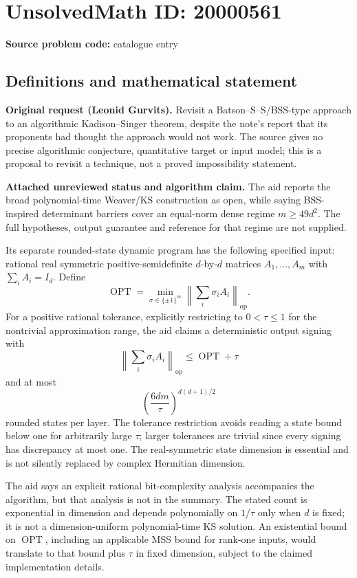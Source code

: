 \documentclass[11pt]{article}
\begin{document}
\section*{UnsolvedMath ID: 20000561}
\textbf{Source problem code:} catalogue entry
\subsection{Definitions and mathematical statement}
\textbf{Original request (Leonid Gurvits).} Revisit a Batson--S--S/BSS-type approach to an algorithmic Kadison--Singer theorem, despite the note's report that its proponents had thought the approach would not work. The source gives no precise algorithmic conjecture, quantitative target or input model; this is a proposal to revisit a technique, not a proved impossibility statement.

\textbf{Attached unreviewed status and algorithm claim.} The aid reports the broad polynomial-time Weaver/KS construction as open, while saying BSS-inspired determinant barriers cover an equal-norm dense regime $m\ge49d^2$. The full hypotheses, output guarantee and reference for that regime are not supplied.

Its separate rounded-state dynamic program has the following specified input: rational real symmetric positive-semidefinite $d$-by-$d$ matrices $A_1,\ldots,A_m$ with $\sum_iA_i=I_d$. Define
\[\operatorname{OPT}=\min_{\sigma\in\{\pm1\}^m}\left\|\sum_i\sigma_iA_i\right\|_{\mathrm{op}}.\]
For a positive rational tolerance, explicitly restricting to $0<\tau\le1$ for the nontrivial approximation range, the aid claims a deterministic output signing with
\[\left\|\sum_i\sigma_iA_i\right\|_{\mathrm{op}}\le\operatorname{OPT}+\tau\]
and at most
\[\left(\frac{6dm}{\tau}\right)^{d(d+1)/2}\]
rounded states per layer. The tolerance restriction avoids reading a state bound below one for arbitrarily large $\tau$; larger tolerances are trivial since every signing has discrepancy at most one. The real-symmetric state dimension is essential and is not silently replaced by complex Hermitian dimension.

The aid says an explicit rational bit-complexity analysis accompanies the algorithm, but that analysis is not in the summary. The stated count is exponential in dimension and depends polynomially on $1/\tau$ only when $d$ is fixed; it is not a dimension-uniform polynomial-time KS solution. An existential bound on $\operatorname{OPT}$, including an applicable MSS bound for rank-one inputs, would translate to that bound plus $\tau$ in fixed dimension, subject to the claimed implementation details.
\end{document}
